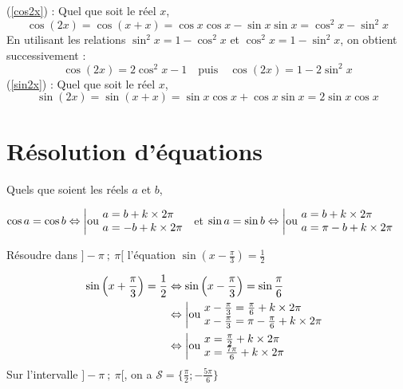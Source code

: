 \documentclass[french]{book}
\newcommand{\cals}{\mathscr{S}}
\begin{document}
\begin{demo}
(\ref{cos2x}) : Quel que soit le r\'eel $x$,
 \[\cos(2x)=\cos(x+x)=\cos x\cos x-\sin x\sin x=\cos^2x-\sin^2x\]
En utilisant les relations $\sin^2x=1-\cos^2x$ et $\cos^2x=1-\sin^2x$, on obtient successivement :
\[\cos(2x)=2\cos^2x-1\quad\text{puis}\quad\cos(2x)=1-2\sin^2x\]
(\ref{sin2x}) : Quel que soit le r\'eel $x$,
 \[\sin(2x)=\sin(x+x)=\sin x\cos x+\cos x\sin x=2\sin x\cos x\]

\end{demo}

\section{R\'esolution d'\'equations}
\begin{prop}
Quels que soient les r\'eels $a$ et $b$,

 $\cos a=\cos b \Leftrightarrow
   \left|\text{ou }
     \begin{array}{@{}l}
	 a=b+k\times2\pi \\
	 a=-b+k\times2\pi
     \end{array}
   \right.$
     \hfill et\hfill
 $\sin a=\sin b \Leftrightarrow
   \left|\text{ou }
     \begin{array}{@{}l}
	 a=b+k\times2\pi \\
	 a=\pi-b+k\times2\pi
     \end{array}
   \right.$
\end{prop}

\begin{exemple}
R\'esoudre dans $]-\pi~;~\pi[$ l'\'equation $\sin\left(x-\frac{\pi}{3}\right)=\frac{1}{2}$
\end{exemple}
\begin{align*}
\sin\left(x+\frac{\pi}{3}\right)=\frac{1}{2} &\Leftrightarrow \sin\left(x-\frac{\pi}{3}\right)=\sin \frac{\pi}{6}\\
&\Leftrightarrow
    \left|\text{ou }
     \begin{array}{@{}l}
	 x-\frac{\pi}{3}=\frac{\pi}{6}+k\times2\pi \\
	 x-\frac{\pi}{3}=\pi-\frac{\pi}{6}+k\times2\pi
     \end{array}
   \right.\\
&\Leftrightarrow
    \left|\text{ou }
     \begin{array}{@{}l}
	 x=\frac{\pi}{2}+k\times2\pi \\
	 x=\frac{7\pi}{6}+k\times2\pi
     \end{array}
   \right.
\end{align*}
Sur l'intervalle $]-\pi~;~\pi[$, on a $\cals=\{\frac{\pi}{2};-\frac{5\pi}{6}\}$
\end{document}
